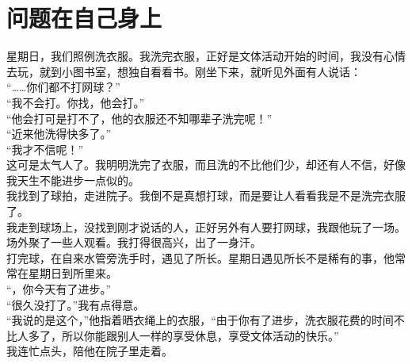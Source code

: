 \fancyhead[RO]{} %
\fancyhead[LE]{} %
\chapter*{问题在自己身上}
\thispagestyle{empty}
星期日，我们照例洗衣服。我洗完衣服，正好是文体活动开始的时间，我没有心情去玩，就到小图书室，想独自看看书。刚坐下来，就听见外面有人说话：\\

“……你们都不打网球？”\\

“我不会打。你找，他会打。”\\

“他会打可是打不了，他的衣服还不知哪辈子洗完呢！”\\

“近来他洗得快多了。”\\

“我才不信呢！”\\

这可是太气人了。我明明洗完了衣服，而且洗的不比他们少，却还有人不信，好像我天生不能进步一点似的。\\

我找到了球拍，走进院子。我倒不是真想打球，而是要让人看看我是不是洗完衣服了。\\

我走到球场上，没找到刚才说话的人，正好另外有人要打网球，我跟他玩了一场。场外聚了一些人观看。我打得很高兴，出了一身汗。\\

打完球，在自来水管旁洗手时，遇见了所长。星期日遇见所长不是稀有的事，他常常在星期日到所里来。\\

“，你今天有了进步。”\\

“很久没打了。”我有点得意。\\

“我说的是这个，”他指着晒衣绳上的衣服，“由于你有了进步，洗衣服花费的时间不比人多了，所以你能跟别人一样的享受休息，享受文体活动的快乐。”\\

我连忙点头，陪他在院子里走着。\\

